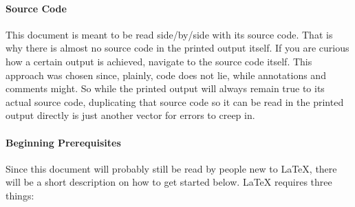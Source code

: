 \paragraph{Source Code}
This document is meant to be read side\-/by\-/side with its source code.
That is why there is almost no source code in the printed output itself.
If you are curious how a certain output is achieved, navigate to the source code
itself.
This approach was chosen since, plainly, code does not lie, while annotations and
comments might.
So while the printed output will always remain true to its actual source code,
duplicating that source code so it can be read in the printed output directly
is just another vector for errors to creep in.

\paragraph{Beginning Prerequisites}
Since this document will probably still be read by people new to \LaTeX{}, there
will be a short description on how to get started below.
\LaTeX{} requires three things:
